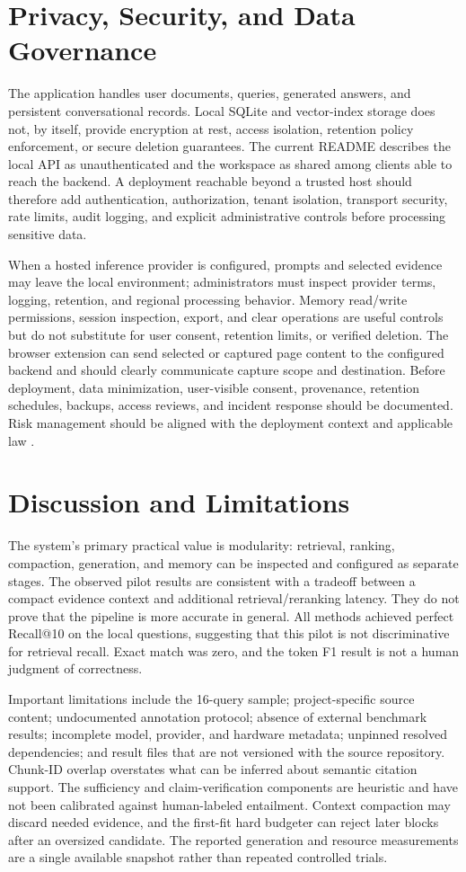 \documentclass[conference]{IEEEtran}
\begin{document}
\section{Privacy, Security, and Data Governance}
The application handles user documents, queries, generated answers, and
persistent conversational records. Local SQLite and vector-index storage
does not, by itself, provide encryption at rest, access isolation, retention
policy enforcement, or secure deletion guarantees. The current README
describes the local API as unauthenticated and the workspace as shared among
clients able to reach the backend. A deployment reachable beyond a trusted
host should therefore add authentication, authorization, tenant isolation,
transport security, rate limits, audit logging, and explicit administrative
controls before processing sensitive data.

When a hosted inference provider is configured, prompts and selected evidence
may leave the local environment; administrators must inspect provider terms,
logging, retention, and regional processing behavior. Memory read/write
permissions, session inspection, export, and clear operations are useful
controls but do not substitute for user consent, retention limits, or
verified deletion. The browser extension can send selected or captured page
content to the configured backend and should clearly communicate capture
scope and destination. Before deployment, data minimization, user-visible
consent, provenance, retention schedules, backups, access reviews, and
incident response should be documented. Risk management should be aligned
with the deployment context and applicable law \cite{nist2023airmf}.

\section{Discussion and Limitations}
The system's primary practical value is modularity: retrieval, ranking,
compaction, generation, and memory can be inspected and configured as
separate stages. The observed pilot results are consistent with a tradeoff
between a compact evidence context and additional retrieval/reranking
latency. They do not prove that the pipeline is more accurate in general.
All methods achieved perfect Recall@10 on the local questions, suggesting
that this pilot is not discriminative for retrieval recall. Exact match was
zero, and the token F1 result is not a human judgment of correctness.

Important limitations include the 16-query sample; project-specific source
content; undocumented annotation protocol; absence of external benchmark
results; incomplete model, provider, and hardware metadata; unpinned resolved
dependencies; and result files that are not versioned with the source
repository. Chunk-ID overlap overstates what can be inferred about semantic
citation support. The sufficiency and claim-verification components are
heuristic and have not been calibrated against human-labeled entailment.
Context compaction may discard needed evidence, and the first-fit hard
budgeter can reject later blocks after an oversized candidate. The reported
generation and resource measurements are a single available snapshot rather
than repeated controlled trials.
\end{document}
